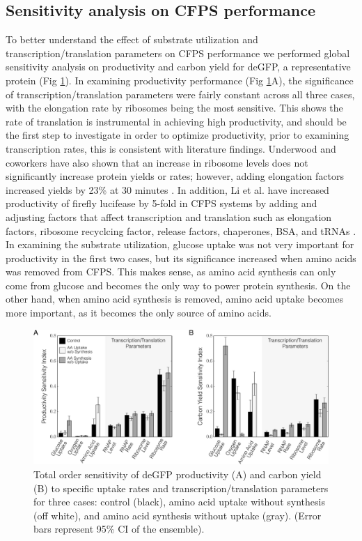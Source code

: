 \documentclass[journal=asbcd6,manuscript=article]{achemso}
\begin{document}
\subsection{Sensitivity analysis on CFPS performance}
To better understand the effect of substrate utilization and transcription/translation parameters on CFPS performance we performed global sensitivity analysis on productivity and carbon yield for deGFP, a representative protein (Fig \ref{fig:SI_GFP}).
In examining productivity performance (Fig \ref{fig:SI_GFP}A), the significance of transcription/translation parameters were fairly constant across all three cases, with the elongation rate by ribosomes being the most sensitive.
This shows the rate of translation is instrumental in achieving high productivity, and should be the first step to investigate in order to optimize productivity, prior to examining transcription rates, this is consistent with literature findings.
Underwood and coworkers have also shown that an increase in ribosome levels does not significantly increase protein yields or rates; however, adding elongation factors increased yields by 23\% at 30 minutes \cite{2005_underwood_biotech}.
In addition, Li et al. have increased productivity of firefly lucifease by 5-fold in CFPS systems by adding and adjusting factors that affect transcription and translation such as elongation factors, ribosome recyclcing factor, release factors, chaperones, BSA, and tRNAs \cite{2014_li_PlosOne}.
In examining the substrate utilization, glucose uptake was not very important for productivity in the first two cases, but its significance increased when amino acids was removed from CFPS.
This makes sense, as amino acid synthesis can only come from glucose and becomes the only way to power protein synthesis.
On the other hand, when amino acid synthesis is removed, amino acid uptake becomes more important, as it becomes the only source of amino acids.
\begin{figure}[t!]
\includegraphics[width=1.00\textwidth]{./Figures/SI_GFP.pdf}
\caption{Total order sensitivity of deGFP productivity (A) and carbon yield (B) to specific uptake rates and transcription/translation parameters for three cases: control (black), amino acid uptake without synthesis (off white), and amino acid synthesis without uptake (gray). (Error bars represent 95\% CI of the ensemble).}
\label{fig:SI_GFP}
\end{figure}
\end{document}
